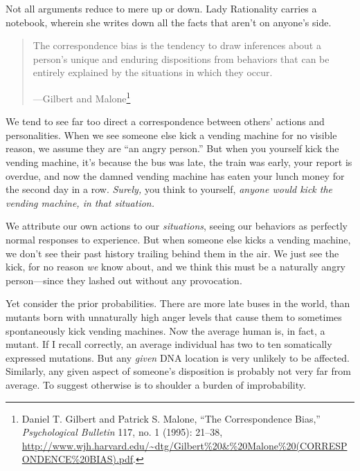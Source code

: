 {
 Not all arguments reduce to mere up or down. Lady Rationality
carries a notebook, wherein she writes down all the facts that
aren't on anyone's side.}

\myendsectiontext


\bigskip


\begin{quote}
{
 The correspondence bias is the tendency to draw inferences about a
person's unique and enduring dispositions from
behaviors that can be entirely explained by the situations in which
they occur.}

{\raggedleft
 {}---Gilbert and Malone\footnote{Daniel T. Gilbert and Patrick S. Malone, ``The
Correspondence Bias,'' \textit{Psychological
Bulletin} 117, no. 1 (1995): 21--38,
\url{http://www.wjh.harvard.edu/\~dtg/Gilbert\%20\&\%20Malone\%20(CORRESPONDENCE\%20BIAS).pdf}.}
\par}
\end{quote}


{
 We tend to see far too direct a correspondence between
others' actions and personalities. When we see someone
else kick a vending machine for no visible reason, we assume they are
``an angry person.'' But when you
yourself kick the vending machine, it's because the bus
was late, the train was early, your report is overdue, and now the
damned vending machine has eaten your lunch money for the second day in
a row. \textit{Surely,} you think to yourself, \textit{anyone would
kick the vending machine, in that situation.}}

{
 We attribute our own actions to our \textit{situations}, seeing
our behaviors as perfectly normal responses to experience. But when
someone else kicks a vending machine, we don't see
their past history trailing behind them in the air. We just see the
kick, for no reason \textit{we} know about, and we think this must be a
naturally angry person---since they lashed out without any
provocation.}

{
 Yet consider the prior probabilities. There are more late buses in
the world, than mutants born with unnaturally high anger levels that
cause them to sometimes spontaneously kick vending machines. Now the
average human is, in fact, a mutant. If I recall correctly, an average
individual has two to ten somatically expressed mutations. But any
\textit{given} DNA location is very unlikely to be affected. Similarly,
any given aspect of someone's disposition is probably
not very far from average. To suggest otherwise is to shoulder a burden
of improbability.}

